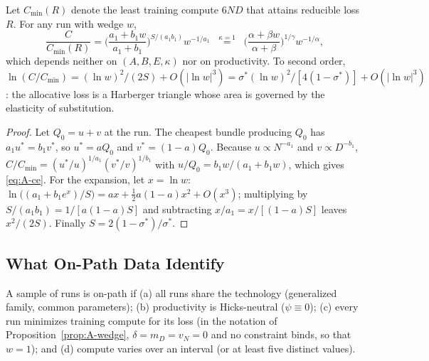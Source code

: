 \begin{lemma}\label{lem:ce}
Let $C_{\min}(R)$ denote the least training compute $6ND$ that attains reducible loss $R$. For any run with wedge $w$,
\begin{equation}\label{eq:A-ce}
\frac{C}{C_{\min}(R)}=\Big(\frac{a_1+b_1w}{a_1+b_1}\Big)^{S/(a_1b_1)}w^{-1/a_1}
\;\;\overset{\kappa=1}{=}\;\;\Big(\frac{\alpha+\beta w}{\alpha+\beta}\Big)^{1/\gamma}w^{-1/\alpha},
\end{equation}
which depends neither on $(A,B,E,\kappa)$ nor on productivity. To second order,
$\ln(C/C_{\min})=(\ln w)^2/(2S)+O(|\ln w|^3)=\sigma^*(\ln w)^2/[4(1-\sigma^*)]+O(|\ln w|^3)$: the allocative loss is a
Harberger triangle whose area is governed by the elasticity of substitution.
\end{lemma}

\begin{proof}
Let $Q_0=u+v$ at the run. The cheapest bundle producing $Q_0$ has $a_1u^*=b_1v^*$, so $u^*=aQ_0$ and $v^*=(1-a)Q_0$.
Because $u\propto N^{-a_1}$ and $v\propto D^{-b_1}$, $C/C_{\min}=(u^*/u)^{1/a_1}(v^*/v)^{1/b_1}$ with $u/Q_0=b_1w/(a_1+b_1w)$,
which gives \eqref{eq:A-ce}. For the expansion, let $x=\ln w$: $\ln\big((a_1+b_1e^x)/S\big)=ax+\tfrac12a(1-a)x^2+O(x^3)$;
multiplying by $S/(a_1b_1)=1/[a(1-a)S]$ and subtracting $x/a_1=x/[(1-a)S]$ leaves $x^2/(2S)$. Finally
$S=2(1-\sigma^*)/\sigma^*$.
\end{proof}

\subsection{What On-Path Data Identify}\label{app:onpath}

\begin{definition}\label{def:onpath}
A sample of runs is on-path if (a) all runs share the technology (generalized family, common parameters); (b)
productivity is Hicks-neutral ($\psi\equiv0$); (c) every run minimizes training compute for its loss (in the notation of
Proposition~\ref{prop:A-wedge}, $\delta=m_D=v_N=0$ and no constraint binds, so that $w=1$); and (d) compute varies over an interval (or at least five distinct values).
\end{definition}

